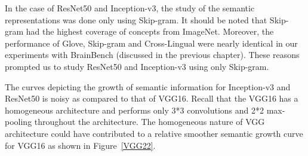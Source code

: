 In the case of ResNet50 and Inception-v3, the study of the semantic representations was done only using Skip-gram. It should be noted that Skip-gram had the highest coverage of concepts from ImageNet. Moreover, the performance of Glove, Skip-gram and Cross-Lingual were nearly identical in our experiments with BrainBench (discussed in the previous chapter). These reasons prompted us to study ResNet50 and Inception-v3 using only Skip-gram.


The curves depicting the growth of semantic information for Inception-v3 and ResNet50 is noisy as compared to that of VGG16. Recall that the VGG16 has a homogeneous architecture and performs only 3*3 convolutions and 2*2 max-pooling throughout the architecture. The homogeneous nature of VGG architecture could have contributed to a relative smoother semantic growth curve for VGG16 as shown in Figure~\ref{VGG22}.

